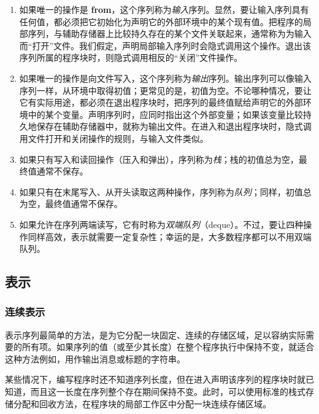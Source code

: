 \documentclass[twoside,11pt,fontset=none]{ctexbook}
\begin{document}
\begin{enumerate}[wide, nosep, label=(\arabic*)]
	\item 如果唯一的操作是 \textbf{from}，这个序列称为\textit{输入}序列。显然，要让输入序列具有任何值，都必须把它初始化为声明它的外部环境中的某个现有值。把程序的局部序列，与辅助存储器上比较持久存在的某个文件关联起来，通常称为为输入而“打开”文件。我们假定，声明局部输入序列时会隐式调用这个操作。退出该序列所属的程序块时，则隐式调用相反的“关闭”文件操作。

	\item 如果唯一的操作是向文件写入，这个序列称为\textit{输出}序列。输出序列可以像输入序列一样，从环境中取得初值；更常见的是，初值为空。不论哪种情况，要让它有实际用途，都必须在退出程序块时，把序列的最终值赋给声明它的外部环境中的某个变量。声明序列时，应同时指出这个外部变量；如果该变量比较持久地保存在辅助存储器中，就称为输出文件。在进入和退出程序块时，隐式调用文件打开和关闭操作的规则，与输入文件类似。

	\item 如果只有写入和读回操作（压入和弹出），序列称为\textit{栈}；栈的初值总为空，最终值通常不保存。

	\item 如果只有在末尾写入、从开头读取这两种操作，序列称为\textit{队列}；同样，初值总为空，最终值通常不保存。

	\item 如果允许在序列两端读写，它有时称为\textit{双端队列}（deque）。不过，要让四种操作同样高效，表示就需要一定复杂性；幸运的是，大多数程序都可以不用双端队列。
\end{enumerate}

\subsection{表示}

\subsubsection{连续表示}

表示序列最简单的方法，是为它分配一块固定、连续的存储区域，足以容纳实际需要的所有项。如果序列的值（或至少其长度）在整个程序执行中保持不变，就适合这种方法\textemdash{}例如，用作输出消息或标题的字符串。

某些情况下，编写程序时还不知道序列长度，但在进入声明该序列的程序块时就已知道，而且这一长度在序列整个存在期间保持不变。此时，可以使用标准的栈式存储分配和回收方法，在程序块的局部工作区中分配一块连续存储区域。
\end{document}

